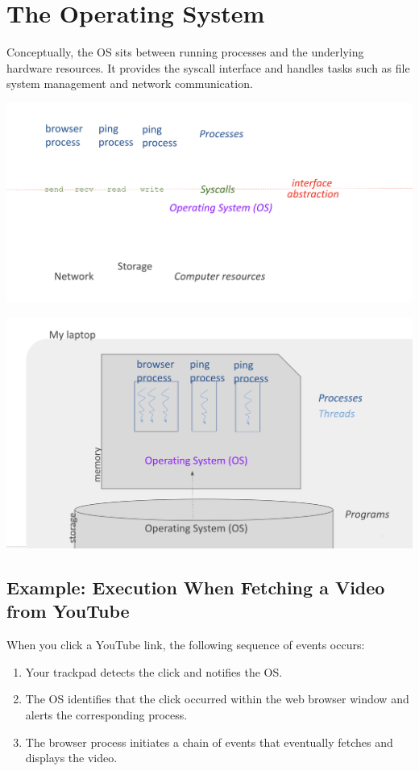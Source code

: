 \documentclass[../../compsys.tex]{subfiles}
\begin{document}
\section{The Operating System}
Conceptually, the OS sits between running processes and the underlying hardware resources. It provides the syscall interface and handles tasks such as file system management and network communication. \\
\begin{minipage}{0.45\textwidth}
\begin{center}
  \includegraphics[width=1.15\textwidth]{chapters/L1/images/isa_os.png}
\end{center}
\end{minipage}
\hfill
\vline
\hfill
\begin{minipage}{0.45\textwidth}
\begin{center}
  \includegraphics[width=1.15\textwidth]{chapters/L1/images/os.png}
\end{center}
\end{minipage}

\subsection{Example: Execution When Fetching a Video from YouTube}
When you click a YouTube link, the following sequence of events occurs:
\begin{enumerate}
  \item Your trackpad detects the click and notifies the OS.
  \item The OS identifies that the click occurred within the web browser window and alerts the corresponding process.
  \item The browser process initiates a chain of events that eventually fetches and displays the video.
\end{enumerate}
\end{document}
